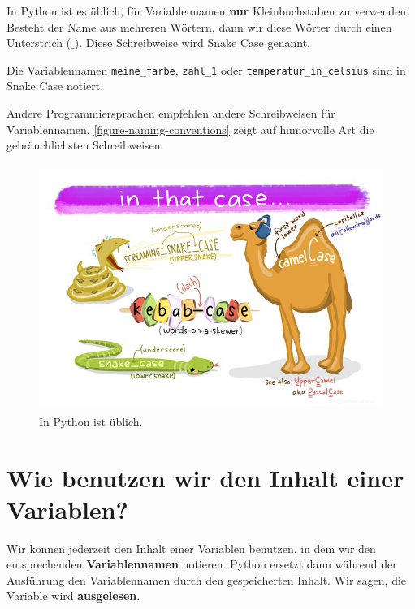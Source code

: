 \begin{cleancode}
In Python ist es üblich, für Variablennamen \textbf{nur} Kleinbuchstaben zu verwenden. Besteht der Name aus mehreren Wörtern, dann  wir diese Wörter durch einen Unterstrich ($\_$). Diese Schreibweise wird Snake Case genannt. 
\end{cleancode}

\begin{example}
	Die Variablennamen \lstinline{meine_farbe}, \lstinline{zahl_1} oder \lstinline{temperatur_in_celsius} sind in Snake Case notiert.
\end{example}

\begin{hinweis}
	Andere Programmiersprachen empfehlen andere Schreibweisen für Variablennamen. \autoref{figure-naming-conventions} zeigt auf humorvolle Art die gebräuchlichsten Schreibweisen.	
\end{hinweis}

\begin{figure}[htb]
	\centering
	\includegraphics[height=8cm]{naming_conventions}
	\caption{In Python ist \protect{} üblich.}
	\label{figure-naming-conventions}
\end{figure}


\section{Wie benutzen wir den Inhalt einer Variablen?}

Wir können jederzeit den Inhalt einer Variablen benutzen, in dem wir den entsprechenden \textbf{Variablennamen} notieren. Python ersetzt dann während der Ausführung den Variablennamen durch den gespeicherten Inhalt. Wir sagen, die Variable wird \textbf{ausgelesen}.


